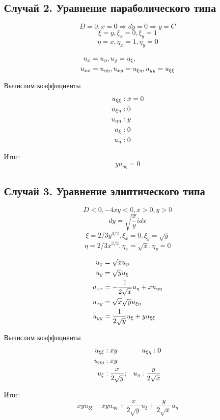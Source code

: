 \documentclass[a4paper,12pt]{article}
\begin{document}
\subsection{Случай 2. Уравнение параболического типа}
$$D = 0, x = 0 \Rightarrow dy = 0 \Rightarrow y = C$$
$$\xi = y, \xi_x = 0, \xi_y = 1$$
$$\eta = x, \eta_x = 1, \eta_y = 0$$

\begin{align}
u_x &= u_\eta, \notag
u_y = u_\xi, \notag \\
u_{xx} &= u_{\eta\eta}, \notag
u_{xy} = u_{\xi\eta}, \notag
u_{yy} = u_{\xi\xi} \notag
\end{align}

Вычислим коэффициенты
\begin{align}
u_{\xi\xi} &: x = 0 \notag \\
u_{\xi\eta} &: 0 \notag \\
u_{\eta\eta} &: y \notag \\
u_{\xi} &: 0 \notag \\
u_\eta &: 0 \notag
\end{align}

Итог:
$$yu_{\eta\eta} = 0$$

\subsection{Случай 3. Уравнение элиптического типа}
$$D < 0, -4xy < 0, x>0, y>0$$
$$dy = \sqrt{\frac{x}{y}}idx$$
$$\xi = 2/3y^{3/2}, \xi_x = 0, \xi_y = \sqrt{y}$$
$$\eta = 2/3x^{3/2}, \eta_x = \sqrt{x}, \eta_y = 0$$

\begin{align}
u_x &= \sqrt{x}u_\eta \notag \\
u_y &= \sqrt{y}u_\xi \notag \\
u_{xx} &= -\frac{1}{2\sqrt{x}}u_\eta + xu_{\eta\eta} \notag \\
u_{xy} &= \sqrt{x}\sqrt{y}u_{\xi\eta} \notag \\
u_{yy} &= \frac{1}{2\sqrt{y}}u_\xi + yu_{\xi\xi} \notag
\end{align}

Вычислим коэффициенты
\begin{align}
u_{\xi\xi} &: xy \notag     &u_{\xi\eta} : 0 \notag \\
u_{\eta\eta} &: xy \notag \\
u_\xi &: \frac{x}{2\sqrt{y}}; &u_\eta : \frac{y}{2\sqrt{x}} \notag 
\end{align}

Итог:
$$xyu_{\xi\xi} + xyu_{\eta\eta} + \frac{x}{2\sqrt{y}}u_\xi + \frac{y}{2\sqrt{x}}u_\eta$$
\end{document}
